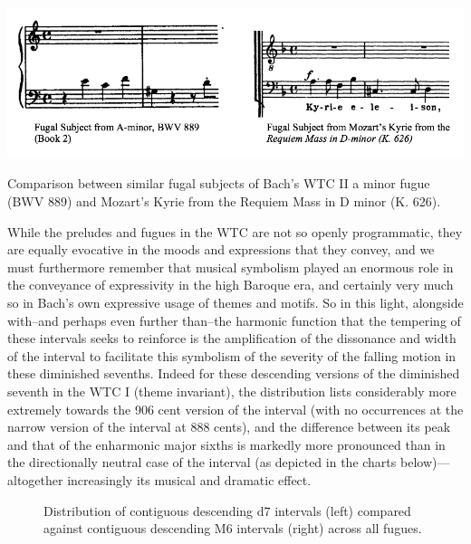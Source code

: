 \begin{Example}[H]
\centering
\includegraphics{kyrie_text.png}
\caption{Comparison between similar fugal subjects of Bach's WTC II a minor fugue (BWV 889) and Mozart's Kyrie from the Requiem Mass in D minor (K. 626).}
\end{Example}
    While the preludes and fugues in the WTC are not so openly programmatic,
they are equally evocative in the moods and expressions that they
convey, and we must furthermore remember that musical symbolism played
an enormous role in the conveyance of expressivity in the high Baroque
era, and certainly very much so in Bach's own expressive usage of themes
and motifs. So in this light, alongside with--and perhaps even further
than--the harmonic function that the tempering of these intervals
seeks to reinforce is the amplification of the dissonance and width of
the interval to facilitate this symbolism of the severity of the falling
motion in these diminished sevenths. Indeed for these descending
versions of the diminished seventh in the WTC I (theme invariant), the
distribution lists considerably more extremely towards the 906 cent
version of the interval (with no occurrences at the narrow version of
the interval at 888 cents), and the difference between its peak and that
of the enharmonic major sixths is markedly more pronounced than in the
directionally neutral case of the interval (as depicted in the charts
below)---altogether increasingly its musical and dramatic effect.



\begin{figure}[H]
\vspace{1.5em}
    \centering
    \caption[Distribution of contiguous descending d7 intervals compared against contiguous descending M6 intervals across all fugues. ]{Distribution of contiguous descending d7 intervals (left) compared against contiguous descending M6 intervals (right) across all fugues.}
\end{figure}

